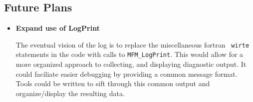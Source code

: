 \subsection{Future Plans}

\begin{itemize}
\item{\bf Expand use of LogPrint}

The eventual vision of the log is to replace the miscellaneous fortran {\tt
wirte} statements in the code with calls to {\tt MFM\_LogPrint}.  This would
allow for a more organized approach to collecting, and displaying diagnostic
output.  It could faciliate easier debugging by providing a common message
format.  Tools could be written to sift through this common output and
organize/display the resulting data.

\end{itemize}
